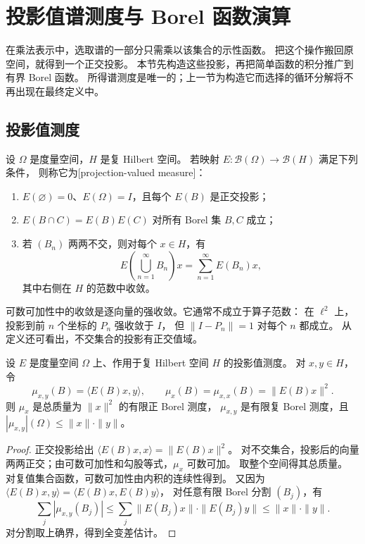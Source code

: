 \section{投影值谱测度与 Borel 函数演算}
\label{b1:sec:2904}

在乘法表示中，选取谱的一部分只需乘以该集合的示性函数。
把这个操作搬回原空间，就得到一个正交投影。
本节先构造这些投影，再把简单函数的积分推广到有界 Borel 函数。
所得谱测度是唯一的；上一节为构造它而选择的循环分解将不再出现在最终定义中。

\subsection{投影值测度}
\label{b1:subsec:290401}

\begin{definition}[投影值测度]
\label{b1:def:29-pvm}
设 \(\Omega\) 是度量空间，\(H\) 是复 Hilbert 空间。
若映射 \(E:\mathcal B(\Omega)\to\mathcal B(H)\) 满足下列条件，
则称它为[projection-valued measure]：
\begin{enumerate}
\item \(E(\varnothing)=0\)、\(E(\Omega)=I\)，且每个 \(E(B)\) 是正交投影；
\item \(E(B\cap C)=E(B)E(C)\) 对所有 Borel 集 \(B,C\) 成立；
\item 若 \((B_n)\) 两两不交，则对每个 \(x\in H\)，有
\[
 E\left(\bigcup_{n=1}^\infty B_n\right)x
 =\sum_{n=1}^\infty E(B_n)x,
\]
其中右侧在 \(H\) 的范数中收敛。
\end{enumerate}
\end{definition}

可数可加性中的收敛是逐向量的强收敛。它通常不成立于算子范数：
在 \(\ell^2\) 上，投影到前 \(n\) 个坐标的 \(P_n\) 强收敛于 \(I\)，
但 \(\|I-P_n\|=1\) 对每个 \(n\) 都成立。
从定义还可看出，不交集合的投影有正交值域。

\begin{proposition}[投影值测度的标量化]
\label{b1:prop:29-pvm-scalarization}
设 \(E\) 是度量空间 \(\Omega\) 上、作用于复 Hilbert 空间 \(H\) 的投影值测度。
对 \(x,y\in H\)，令
\[
 \mu_{x,y}(B)=\langle E(B)x,y\rangle,\qquad
 \mu_x(B)=\mu_{x,x}(B)=\|E(B)x\|^2.
\]
则 \(\mu_x\) 是总质量为 \(\|x\|^2\) 的有限正 Borel 测度，
\(\mu_{x,y}\) 是有限复 Borel 测度，且
\( |\mu_{x,y}|(\Omega)\leq\|x\|\cdot\|y\|\)。
\end{proposition}
\begin{proof}
正交投影给出 \(\langle E(B)x,x\rangle=\|E(B)x\|^2\)。
对不交集合，投影后的向量两两正交；由可数可加性和勾股等式，\(\mu_x\) 可数可加。
取整个空间得其总质量。
对复值集合函数，可数可加性由内积的连续性得到。
又因为 \(\langle E(B)x,y\rangle=\langle E(B)x,E(B)y\rangle\)，
对任意有限 Borel 分割 \((B_j)\)，有
\[
 \sum_j|\mu_{x,y}(B_j)|
 \leq\sum_j\|E(B_j)x\|\cdot\|E(B_j)y\|
 \leq\|x\|\cdot\|y\|.
\]
对分割取上确界，得到全变差估计。
\end{proof}

